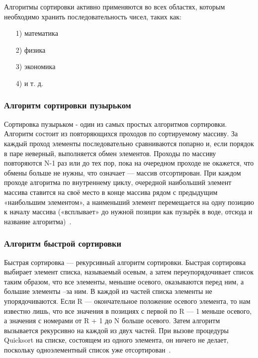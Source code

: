 \documentclass[a4paper,12pt]{article}
\begin{document}
	Алгоритмы сортировки активно применяются во всех областях, которым необходимо хранить последовательность чисел, таких как:
	\begin{enumerate}
	\item[1)] математика
	\item[2)] физика
	\item[3)] экономика
	\item[4)] и т. д.
	\end{enumerate}
	
	    \subsubsection{Алгоритм сортировки пузырьком}
    	Сортировка пузырьком - один из самых простых алгоритмов сортировки.
Алгоритм состоит из повторяющихся проходов по сортируемому массиву. 
За каждый проход элементы последовательно сравниваются попарно и, если порядок в паре неверный, выполняется обмен элементов. Проходы по массиву повторяются N-1 раз или до тех пор, пока на очередном проходе не окажется, что обмены больше не нужны, что означает — массив отсортирован. При каждом проходе алгоритма по внутреннему циклу, очередной наибольший элемент массива ставится на своё место в конце массива рядом с предыдущим «наибольшим элементом», а наименьший элемент перемещается на одну позицию к началу массива («всплывает» до нужной позиции как пузырёк в воде, отсюда и название алгоритма)~\cite{bubble}.	
		    
	  	\subsubsection{Алгоритм быстрой сортировки}
	  	Быстрая сортировка —  рекурсивный алгоритм сортировки. 
Быстрая сортировка выбирает элемент списка, называемый осевым,
а затем переупорядочивает список таким образом, что все элементы,
меньшие осевого, оказываются перед ним, а большие элементы --за
ним. В каждой из частей списка элементы не упорядочиваются. Если
R — окончательное положение осевого элемента, то нам известно лишь,
что все значения в позициях с первой по R — 1 меньше осевого, а значения
с номерами от R + 1 до N больше осевого. Затем алгоритм 
вызывается рекурсивно на каждой из двух частей. При вызове процедуры Quicksort на списке, состоящем из одного элемента, он ничего не
делает, поскольку одноэлементный список уже отсортирован~\cite{makkonell}.
\end{document}

